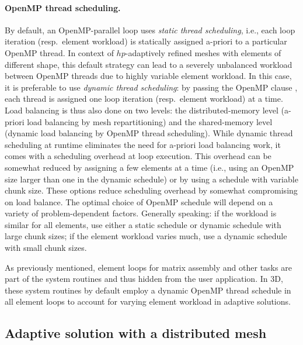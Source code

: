 \paragraph{OpenMP thread scheduling.}
By default, an OpenMP-parallel loop uses \emph{static thread scheduling}, i.e., each loop iteration (resp.\ element workload) is statically assigned a-priori to a particular OpenMP thread.
In context of $hp$-adaptively refined meshes with elements of different shape, this default strategy can lead to a severely unbalanced workload between OpenMP threads due to highly variable element workload. In this case, it is preferable to use \emph{dynamic thread scheduling}: by passing the OpenMP clause , each thread is assigned one loop iteration (resp.\ element workload) at a time. Load balancing is thus also done on two levels: the distributed-memory level (a-priori load balancing by mesh repartitioning) and the shared-memory level (dynamic load balancing by OpenMP thread scheduling). While dynamic thread scheduling at runtime eliminates the need for a-priori load balancing work, it comes with a scheduling overhead at loop execution.
This overhead can be somewhat reduced by assigning a few elements at a time (i.e., using an OpenMP  size larger than one in the dynamic schedule) or by using a  schedule with variable chunk size. These options reduce scheduling overhead by somewhat compromising on load balance. The optimal choice of OpenMP schedule will depend on a variety of problem-dependent factors. Generally speaking: if the workload is similar for all elements, use either a static schedule or dynamic schedule with large chunk sizes; if the element workload varies much, use a dynamic schedule with small chunk sizes.

\begin{remark}
As previously mentioned, element loops for matrix assembly and other tasks are part of the system routines and thus hidden from the user application. In \hp3D, these system routines by default employ a dynamic OpenMP thread schedule in all element loops to account for varying element workload in adaptive solutions.
\end{remark}

\subsection{Adaptive solution with a distributed mesh}
\label{sec:parallel-adaptivity}

